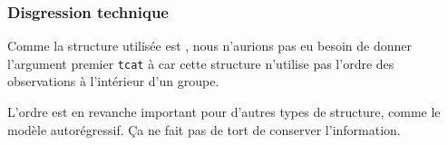 \documentclass{beamer}
\begin{document}
% 


\begin{frame}[fragile]
\frametitle{Disgression technique}
\bi
\item Comme la structure utilisée est , nous n'aurions pas eu besoin de donner l'argument premier \texttt{tcat} à    car cette structure n'utilise pas l'ordre des observations à l'intérieur d'un groupe. 
\item L'ordre est en revanche important pour d'autres types de structure, comme le modèle autorégressif. Ça ne fait pas de tort de conserver l'information.
\ei
\end{frame}
\end{document}
